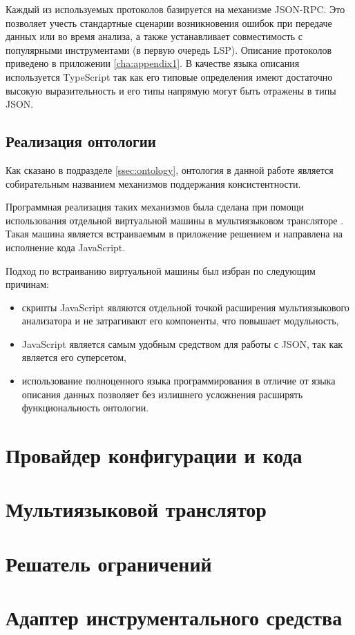 Каждый из используемых протоколов базируется на механизме JSON-RPC. Это позволяет учесть стандартные
сценарии возникновения ошибок при передаче данных или во время анализа, а также устанавливает
совместимость с популярными инструментами (в первую очередь LSP). Описание протоколов
приведено в приложении \ref{cha:appendix1}. В качестве языка описания используется TypeScript так как
его типовые определения имеют достаточно высокую выразительность и его типы напрямую могут быть отражены в типы JSON.

\subsection{Реализация онтологии}

Как сказано в подразделе \ref{ssec:ontology}, онтология в данной работе является собирательным названием
механизмов поддержания консистентности.

Программная реализация таких механизмов была сделана при помощи использования отдельной виртуальной машины
в мультиязыковом трансляторе \cite{goja}. Такая машина является встраиваемым в приложение решением и
направлена на исполнение кода JavaScript.

Подход по встраиванию виртуальной машины был избран по следующим причинам:
\begin{itemize}
    \item скрипты JavaScript являются отдельной точкой расширения мультиязыкового анализатора и не затрагивают его компоненты, что повышает
    модульность,
    \item JavaScript является самым удобным средством для работы с JSON, так как является его суперсетом,
    \item использование полноценного языка программирования в отличие от языка описания данных позволяет
    без излишнего усложнения расширять функциональность онтологии.
\end{itemize}

\section{Провайдер конфигурации и кода}

\section{Мультиязыковой транслятор}

\section{Решатель ограничений}

\section{Адаптер инструментального средства}

